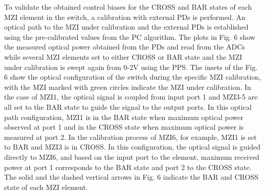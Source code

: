To validate the obtained control biases for the CROSS and BAR states of each MZI element in the switch, a calibration with external PDs is performed. An optical path to the MZI under calibration and the external PDs is established using the pre-calibrated values from the PC algorithm. The plots in Fig. 6 show the measured optical power obtained from the PDs and read from the ADCs while several MZI elements set to either CROSS or BAR state and the MZI under calibration is swept again from 0-2V using the PPS. The insets of the Fig. 6 show the optical configuration of the switch during the specific MZI calibration, with the MZI marked with green circles indicate the MZI under calibration. In the case of MZI1, the optical signal is coupled from input port 1 and MZI3-5 are all set to the BAR state to guide the signal to the output ports. In this optical path configuration, MZI1 is in the BAR state when maximum optical power observed at port 1  and in the CROSS state when maximum optical power is measured at port 2. In the calibration process of MZI6, for example, MZI1 is set to BAR and MZI3 is in CROSS. In this configuration, the optical signal is guided directly to MZI6, and based on the input port to the element, maximum received power at port 1 corresponds to the BAR state and port 2 to the CROSS state. The solid and the dashed vertical arrows in Fig. 6 indicate the BAR and CROSS state of each MZI element. 


